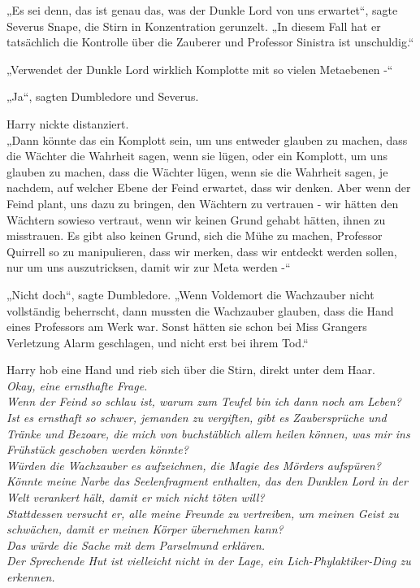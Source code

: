 {„Es sei denn, das ist genau das, was der Dunkle Lord von uns erwartet“, sagte Severus Snape, die Stirn in Konzentration gerunzelt. „In diesem Fall hat er tatsächlich die Kontrolle über die Zauberer und Professor Sinistra ist unschuldig.“

„Verwendet der Dunkle Lord wirklich Komplotte mit so vielen Metaebenen -“

„Ja“, sagten Dumbledore und Severus.

Harry nickte distanziert.\\ „Dann könnte das ein Komplott sein, um uns entweder glauben zu machen, dass die Wächter die Wahrheit sagen, wenn sie lügen, oder ein Komplott, um uns glauben zu machen, dass die Wächter lügen, wenn sie die Wahrheit sagen, je nachdem, auf welcher Ebene der Feind erwartet, dass wir denken. Aber wenn der Feind plant, uns dazu zu bringen, den Wächtern zu vertrauen - wir hätten den Wächtern sowieso vertraut, wenn wir keinen Grund gehabt hätten, ihnen zu misstrauen. Es gibt also keinen Grund, sich die Mühe zu machen, Professor Quirrell so zu manipulieren, dass wir merken, dass wir entdeckt werden sollen, nur um uns auszutricksen, damit wir zur Meta werden -“

„Nicht doch“, sagte Dumbledore. „Wenn Voldemort die Wachzauber nicht vollständig beherrscht, dann mussten die Wachzauber glauben, dass die Hand eines Professors am Werk war. Sonst hätten sie schon bei Miss Grangers Verletzung Alarm geschlagen, und nicht erst bei ihrem Tod.“

Harry hob eine Hand und rieb sich über die Stirn, direkt unter dem Haar.\\ \emph{Okay, eine ernsthafte Frage.}\\ \emph{Wenn der Feind so schlau ist, warum zum Teufel bin ich dann noch am Leben?}\\ \emph{Ist es ernsthaft so schwer, jemanden zu vergiften, gibt es Zaubersprüche und Tränke und Bezoare, die mich von buchstäblich allem heilen können, was mir ins Frühstück geschoben werden könnte?}\\ \emph{Würden die Wachzauber es aufzeichnen, die Magie des Mörders aufspüren?}\\ \emph{Könnte meine Narbe das Seelenfragment enthalten, das den Dunklen Lord in der Welt verankert hält, damit er mich nicht töten will?}\\ \emph{Stattdessen versucht er, alle meine Freunde zu vertreiben, um meinen Geist zu schwächen, damit er meinen Körper übernehmen kann?}\\ \emph{Das würde die Sache mit dem Parselmund erklären.}\\ \emph{Der Sprechende Hut ist vielleicht nicht in der Lage, ein Lich-Phylaktiker-Ding zu erkennen.}

}
